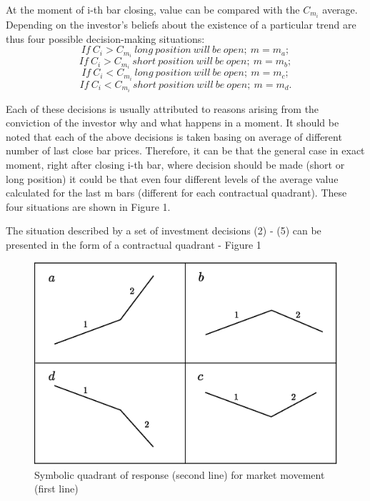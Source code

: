 \documentclass{tewiart}
\begin{document}
At the moment of i-th bar closing, value can be compared with the $C_{m_{i}}$ average. Depending on the investor's beliefs about the existence of a particular trend are thus four possible decision-making situations:
\begin{equation} If\ C_i  > C_{m_{i}}\   long\ position\ will\ be\ open;\ m=m_a; \end{equation}
\begin{equation} If\ C_i  > C_{m_{i}}\   short\ position\ will\ be\ open;\ m=m_b; \end{equation}
\begin{equation} If\ C_i  < C_{m_{i}}\   long\ position\ will\ be\ open;\ m=m_c; \end{equation}
\begin{equation} If\ C_i  < C_{m_{i}}\   short\ position\ will\ be\ open;\ m=m_d. \end{equation}

Each of these decisions is usually attributed to reasons arising from the conviction of the investor why and what happens in a moment. It should be noted that each of the above decisions is taken basing on average of different number of last close bar prices. Therefore, it can be that the general case in exact moment, right after closing i-th bar, where decision should be made (short or long position) it could be that even four different levels of  the average value calculated for the last m bars (different for each contractual quadrant). These four situations are shown in Figure 1.

The situation described by a set of investment decisions (2) - (5) can be presented in the form of a contractual quadrant - Figure 1


\begin{figure}[h!]
 \centering
 \includegraphics[width=\textwidth]{Rysunek0_all2.eps}
 \caption{Symbolic quadrant of response (second line) for market movement (first line)}
\end{figure}
\FloatBarrier
\end{document}
